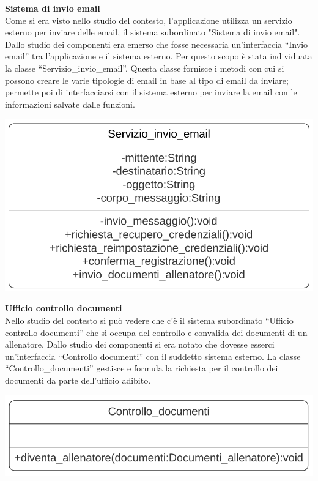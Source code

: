 \documentclass{article}
\begin{document}
      {\large\textbf{Sistema di invio email}}\\

      Come si era visto nello studio del contesto, l’applicazione utilizza un servizio esterno per inviare delle email, il sistema subordinato "Sistema di invio email". Dallo studio dei componenti era emerso che fosse necessaria un’interfaccia “Invio email” tra l’applicazione e il sistema esterno. Per questo scopo è stata individuata la classe “Servizio\_invio\_email”. Questa classe fornisce i metodi con cui si possono creare le varie tipologie di email in base al tipo di email da inviare; permette poi di interfacciarsi con il sistema esterno per inviare la email con le informazioni salvate dalle funzioni.\\
      
      \begin{center}
            \includegraphics[scale=0.5]{classi/Servizio_invio_email.png}
      \end{center}


      {\large\textbf{Ufficio controllo documenti}}\\

      Nello studio del contesto si può vedere che c’è il sistema subordinato “Ufficio controllo documenti” che si occupa del controllo e convalida dei documenti di un allenatore. Dallo studio dei componenti si era notato che dovesse esserci un’interfaccia “Controllo documenti” con il suddetto sistema esterno. La classe “Controllo\_documenti” gestisce e formula la richiesta per il controllo dei documenti da parte dell’ufficio adibito.\\
      
      \begin{center}
            \includegraphics[scale=0.5]{classi/Controllo_documenti.png}
      \end{center}
\end{document}
